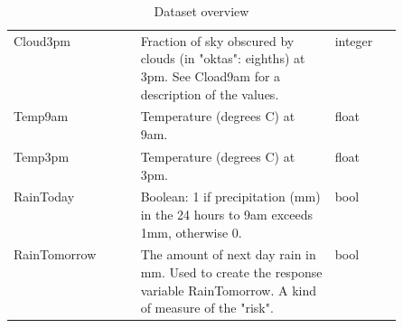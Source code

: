 \documentclass[10pt]{article}
\begin{document}
\begin{table}[h]
\begin{tabular}{l>{\raggedright\arraybackslash}p{0.5\linewidth}l}
 Cloud3pm& Fraction of sky obscured by clouds (in "oktas": eighths) at 3pm. See Cload9am for a description of the values.&integer\\
 Temp9am& Temperature (degrees C) at 9am.&float\\
 Temp3pm& Temperature (degrees C) at 3pm.&float\\
 RainToday& Boolean: 1 if precipitation (mm) in the 24 hours to 9am exceeds 1mm, otherwise 0.&bool\\
 RainTomorrow& The amount of next day rain in mm. Used to create the response variable RainTomorrow. A kind of measure of the "risk".&bool\\
    \end{tabular}
    \caption{Dataset overview}
    \label{tab:data-overview}
\end{table}
\end{document}
